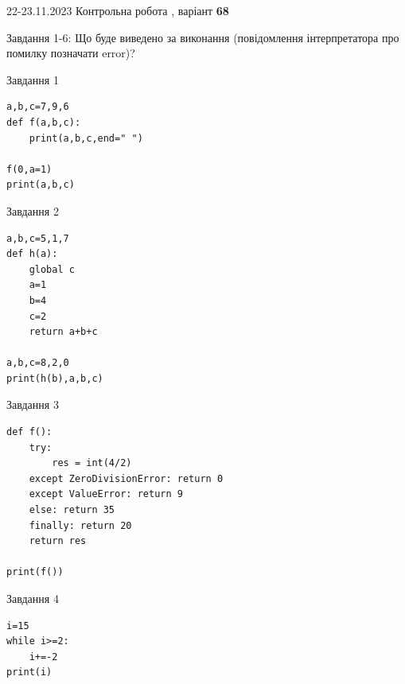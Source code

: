 \documentclass[12pt, ukrainian]{article}
\begin{document}
{{22-23.11.2023 Контрольна робота , варіант  \No \textbf { 68 }\par}}
{

Завдання 1-6: Що буде виведено за виконання (повідомлення інтерпретатора про помилку позначати error)?


\begin{minipage}[t]{9.7cm}                
{\begin{center}Завдання {1}\end{center}}
\begin{verbatim}
a,b,c=7,9,6
def f(a,b,c):
    print(a,b,c,end=" ")

f(0,a=1)
print(a,b,c)
\end{verbatim}     
\end{minipage}
\vline \hspace{8mm}
\begin{minipage}[t]{8.0cm}                
{\begin{center}Завдання {2}\end{center}}
\begin{verbatim}
a,b,c=5,1,7
def h(a):
    global c
    a=1
    b=4
    c=2
    return a+b+c

a,b,c=8,2,0
print(h(b),a,b,c)
\end{verbatim}     
\end{minipage}

\vspace{15mm}
\begin{minipage}[t]{9.7cm}                
{\begin{center}Завдання {3}\end{center}}
\begin{verbatim}
def f():
    try:
        res = int(4/2)
    except ZeroDivisionError: return 0
    except ValueError: return 9
    else: return 35
    finally: return 20
    return res

print(f())
\end{verbatim}     
\end{minipage}
\vline \hspace{8mm}
\begin{minipage}[t]{8.0cm}                
{\begin{center}Завдання {4}\end{center}}
\begin{verbatim}
i=15
while i>=2:
    i+=-2
print(i)
\end{verbatim}     
\end{minipage}

}
\end{document}
